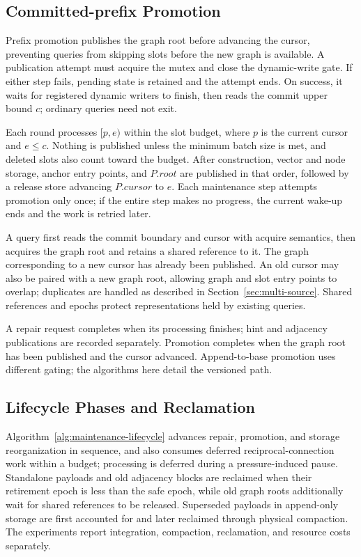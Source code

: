 \documentclass[sigconf,pbalance]{acmart}
\begin{document}
\subsection{Committed-prefix Promotion}
\label{sec:repair-to-promotion}

Prefix promotion publishes the graph root before advancing the cursor, preventing queries from skipping slots before the new graph is available. A publication attempt must acquire the mutex and close the dynamic-write gate. If either step fails, pending state is retained and the attempt ends. On success, it waits for registered dynamic writers to finish, then reads the commit upper bound $c$; ordinary queries need not exit.

Each round processes $[p,e)$ within the slot budget, where $p$ is the current cursor and $e\leq c$. Nothing is published unless the minimum batch size is met, and deleted slots also count toward the budget. After construction, vector and node storage, anchor entry points, and $P.root$ are published in that order, followed by a release store advancing $P.cursor$ to $e$. Each maintenance step attempts promotion only once; if the entire step makes no progress, the current wake-up ends and the work is retried later.

A query first reads the commit boundary and cursor with acquire semantics, then acquires the graph root and retains a shared reference to it. The graph corresponding to a new cursor has already been published. An old cursor may also be paired with a new graph root, allowing graph and slot entry points to overlap; duplicates are handled as described in Section~\ref{sec:multi-source}. Shared references and epochs protect representations held by existing queries.

A repair request completes when its processing finishes; hint and adjacency publications are recorded separately. Promotion completes when the graph root has been published and the cursor advanced. Append-to-base promotion uses different gating; the algorithms here detail the versioned path.

\subsection{Lifecycle Phases and Reclamation}
\label{sec:unified-lifecycle}

Algorithm~\ref{alg:maintenance-lifecycle} advances repair, promotion, and storage reorganization in sequence, and also consumes deferred reciprocal-connection work within a budget; processing is deferred during a pressure-induced pause. Standalone payloads and old adjacency blocks are reclaimed when their retirement epoch is less than the safe epoch, while old graph roots additionally wait for shared references to be released. Superseded payloads in append-only storage are first accounted for and later reclaimed through physical compaction. The experiments report integration, compaction, reclamation, and resource costs separately.
\end{document}
